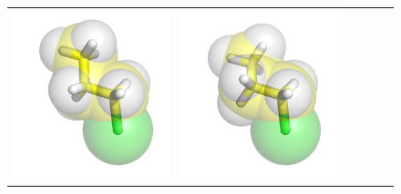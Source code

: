 \documentclass{svmult}
\begin{document}
\begin{figure}
\begin{tabular}{cccccc}
\includegraphics[width=\tmpa]{fig/m003-006} &
\includegraphics[width=\tmpa]{fig/m003-007} &

\end{tabular}
\end{figure}
\end{document}
